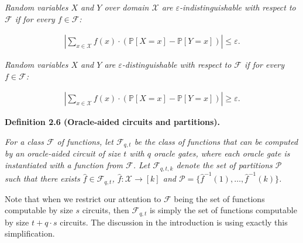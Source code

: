 \emph{Random variables $X$ and $Y$ over domain $\mathcal{X}$ are $\varepsilon$-indistinguishable with respect to $\mathcal{F}$ if for every $f\in\mathcal{F}$:}\par


\[\begin{gathered}
\left|\sum_{x\in\mathcal{X}}f(x)\cdot\left(\mathbb{P}[X=x]-\mathbb{P}[Y=x]\right)\right|\leq\varepsilon.
\end{gathered}\]


\emph{Random variables $X$ and $Y$ are $\varepsilon$-distinguishable with respect to $\mathcal{F}$ if for every $f\in\mathcal{F}$:}\par


\[\begin{gathered}
\left|\sum_{x\in\mathcal{X}}f(x)\cdot\left(\mathbb{P}[X=x]-\mathbb{P}[Y=x]\right)\right|\geq\varepsilon.
\end{gathered}\]







\par\medskip\noindent\textbf{
\textbf{Definition 2.6}\textbf{ }(Oracle-aided circuits and partitions)\textbf{.}
}\par



\emph{For a class $\mathcal{F}$ of functions, let $\mathcal{F}_{q,t}$ be the class of functions that can be computed by an oracle-aided circuit of size $t$ with $q$ oracle gates, where each oracle gate is instantiated with a function from $\mathcal{F}$. Let $\mathcal{F}_{q,t,k}$ denote the set of partitions $\mathcal{P}$ such that there exists $\hat{f}\in\mathcal{F}_{q,t}$, $\hat{f}:\mathcal{X}\rightarrow[k]$ and $\mathcal{P}=\{\hat{f}^{-1}(1),\dots,\hat{f}^{-1}(k)\}$.}\par






Note that when we restrict our attention to $\mathcal{F}$ being the set of functions computable by size $s$ circuits, then $\mathcal{F}_{q,t}$ is simply the set of functions computable by size $t+q\cdot s$ circuits. The discussion in the introduction is using exactly this simplification.\par






